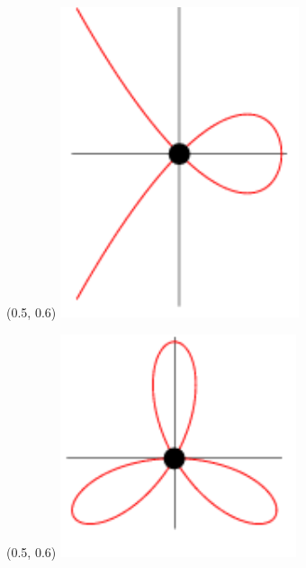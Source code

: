 \documentclass[UKenglish, unknownkeysallowed]{beamer}
\begin{document}
\begin{frame}
    {
        \begin{textblock}{0.15}(0.5, 0.6)
            \includegraphics[width = \textwidth]{node}
        \end{textblock}
    }

    {
        \begin{textblock}{0.25}(0.5, 0.6)
            \includegraphics[width = \textwidth]{triple}
        \end{textblock}
    }


\end{frame}
\end{document}
